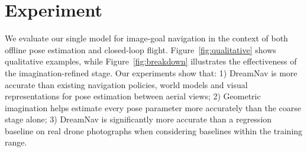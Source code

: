 \section{Experiment}
\label{others}

We evaluate our single model for image-goal navigation in the context of both offline pose estimation and closed-loop flight. Figure~\ref{fig:qualitative} shows qualitative examples, while Figure~\ref{fig:breakdown} illustrates the effectiveness of the imagination-refined stage. Our experiments show that: 1) DreamNav is more accurate than existing navigation policies, world models and visual representations for pose estimation between aerial views; 2) Geometric imagination helps estimate every pose parameter more accurately than the coarse stage alone; 3) DreamNav is significantly more accurate than a regression baseline on real drone photographs when considering baselines within the training range.

